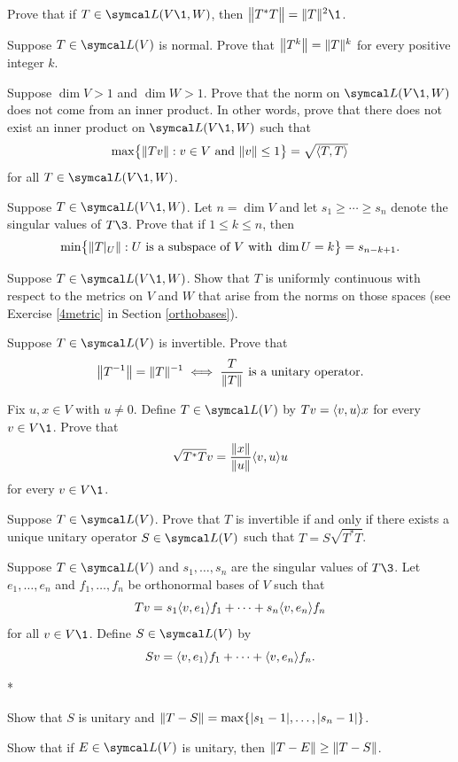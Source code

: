 \begin{exercises}
\exercise
Prove that if $T \in \L(V\1, W)$, then  $\norm[\big]{T^*T} = \norm{T}^2\1$.\label{8Cstar}


\exercise
Suppose $T \in \L(V)$ is normal. Prove that $\norm[\big]{T^k} = \norm{T}^k$ for every positive integer $k$.\label{7normTk}


\exercise
Suppose $\dim V > 1$ and $\dim W > 1$. Prove that the norm on $\L(V\1, W)$ does not come from an inner product. In other words, prove that there does not exist an inner product on $\L(V\1, W)$ such that \label{6notinner}
\[
\max \br[\big]{ \norm{Tv} : v \in V \text{ and } \norm{v} \le 1} = {\textstyle \sqrt{\ip{T, T}}}
\]
for all $T \in \L(V\1, W)$.


\exercise
Suppose $T \in \L(V\1, W)$. Let $n = \dim V$ and let $s_1 \ge \cdots \ge s_n$ denote the singular values of $T\3$. Prove that if $1 \le k \le n$, then \label{7approx}
\[
\min \br[\big]{ \norm{T|_U} : U \text { is a subspace of } V \text{ with } \dim U = k} = s_{n-k+1}.
\]
\exercisedisplayend


\exercise
Suppose $T \in \L(V\1, W)$. Show that $T$ is uniformly continuous with respect to the metrics on $V$ and $W$ that arise from the norms on those spaces (see Exercise \ref{4metric} in Section \ref{orthobases}).


\exercise
Suppose $T \in \L(V)$ is invertible. Prove that
\vspace{-3bp}
\[
\norm[\big]{ T^{-1} } = \norm{T}^{-1} \iff \frac{T}{\norm{T}} \text{ is a unitary operator}.
\]
\vspace{-16bp}


\pagebreak[3]

\exercise
Fix $u, x \in V$ with $u \ne 0$. Define $T \in \L(V)$ by
$
Tv = \ip{v, u}x
$
for every $v \in V\1$.  Prove that
\[
\sqrt{T^* T}v = \frac{ \|x\| }{ \|u\| } \ip{v,u} u
\]
for every $v \in V\1$.


\exercise
Suppose $T \in \L(V)$.  Prove that $T$ is invertible if and only if there exists a
unique unitary operator $S \in \L(V)$ such that $T = S \sqrt{T^* T}$.


\exercise
Suppose $T \in \L(V)$ and $s_1, \ldots, s_n$ are the singular values of $T\3$. Let $e_1, \ldots, e_n$ and $f_1, \ldots, f_n$ be orthonormal bases of $V$ such that \label{7unitary}
\[
Tv = s_1\ip{v, e_1} f_1 + \cdots + s_n \ip{v, e_n} f_n
\]
for all $v \in V\1$. Define $S \in \L(V)$ by
\[
Sv = \ip{v, e_1} f_1 + \cdots + \ip{v, e_n} f_n.
\]
\begin{subtheorem}*
\item
Show that $S$ is unitary and $\norm{T-S} = \max \br{ \abs{s_1 -1}, \ldots, \abs{s_n - 1} }$.
\item
Show that if $E \in \L(V)$ is unitary, then $\norm{T-E} \ge \norm{T-S}$.
\end{subtheorem}



\end{exercises}

